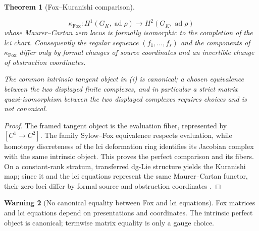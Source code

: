 \documentclass[11pt]{article}
\newtheorem{theorem}{Theorem}[section]
\theoremstyle{definition}
\newtheorem{warning}[theorem]{Warning}
\begin{document}
\begin{theorem}[Fox--Kuranishi comparison]
\begin{enumerate}[label=\textnormal{(\roman*)}]
\[
 \kappa_{\mathrm{Fox}}:
 H^1(G_K,\operatorname{ad}\rho)
 \longrightarrow
 H^2(G_K,\operatorname{ad}\rho)
\]
whose Maurer--Cartan zero locus is formally isomorphic to the completion of the lci chart.  Consequently the regular sequence $(f_1,\ldots,f_s)$ and the components of $\kappa_{\mathrm{Fox}}$ differ only by formal changes of source coordinates and an invertible change of obstruction coordinates.
\end{enumerate}
The common intrinsic tangent object in (i) is canonical; a chosen equivalence between the two displayed finite complexes, and in particular a strict matrix quasi-isomorphism between the two displayed complexes requires choices and is not canonical.
\end{theorem}

\begin{proof}
The framed tangent object is the evaluation fiber, represented by $[C^1\to C^2]$.  The family Sylow--Fox equivalence respects evaluation, while homotopy discreteness of the lci deformation ring identifies its Jacobian complex with the same intrinsic object.  This proves the perfect comparison and its fibers.  On a constant-rank stratum, transferred dg-Lie structure yields the Kuranishi map; since it and the lci equations represent the same Maurer--Cartan functor, their zero loci differ by formal source and obstruction coordinates \cite{WangErickson}.
\end{proof}

\begin{warning}[No canonical equality between Fox and lci equations]\label{warn:no-canonical-fox-lci-equations}
Fox matrices and lci equations depend on presentations and coordinates.  The intrinsic perfect object is canonical; termwise matrix equality is only a gauge choice.
\end{warning}
\end{document}
